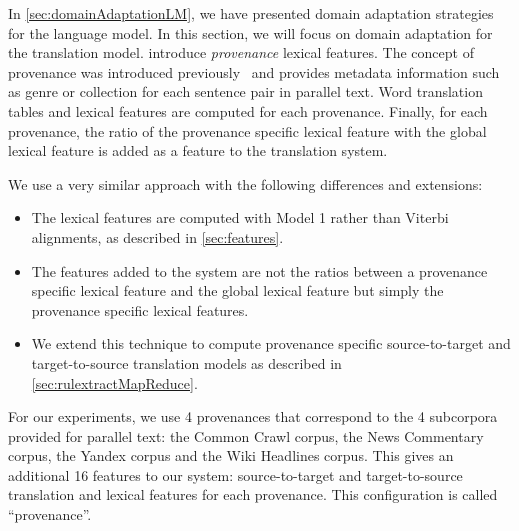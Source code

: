 In \autoref{sec:domainAdaptationLM}, we have presented domain adaptation strategies
for the language model. In this section, we will focus on domain
adaptation for the translation model.
\citet{chiang-deneefe-pust:2011:ACL} introduce \emph{provenance} lexical
features. The concept of provenance was introduced
previously~\citep{matsoukas-rosti-zhang:2009:EMNLP} and
provides metadata information such as genre or collection for each
sentence pair in parallel text.
%
%
Word translation tables and
lexical features are computed for each provenance. %
Finally, for each provenance, the ratio of the provenance specific
lexical feature with the global lexical feature is added as a feature
to the translation system.

We use a very similar approach with the following differences and
extensions:
%
\begin{itemize}
  \item The lexical features are computed with Model 1 rather than Viterbi alignments, as described in
    \autoref{sec:features}.
  \item The features added to the system are not the ratios between a
    provenance specific lexical feature and the global lexical feature but
    simply the provenance specific lexical features.
  \item We extend this technique to compute provenance specific
    source-to-target and target-to-source translation models
    as described in \autoref{sec:rulextractMapReduce}.
\end{itemize}
%
For our experiments, we use 4 provenances that correspond
to the 4 subcorpora provided for parallel text: the Common Crawl corpus, the
News Commentary corpus, the Yandex corpus and the Wiki Headlines
corpus. This gives an additional 16 features to our system: source-to-target
and target-to-source translation and lexical features for each provenance.
This configuration is called ``provenance''.

